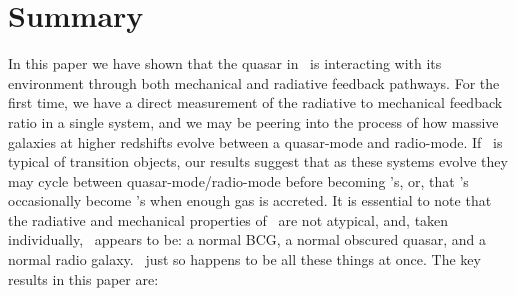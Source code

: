 \documentclass[useAMS,usenatbib]{mn2e}
\begin{document}
\section{Summary}
\label{sec:summ}

In this paper we have shown that the quasar in \inine\ is interacting
with its environment through both mechanical and radiative feedback
pathways. For the first time, we have a direct measurement of the
radiative to mechanical feedback ratio in a single system, and we may
be peering into the process of how massive galaxies at higher
redshifts evolve between a quasar-mode and radio-mode. If \irs\ is
typical of transition objects, our results suggest that as these
systems evolve they may cycle between quasar-mode/radio-mode before
becoming \fri's, or, that \fri's occasionally become \frii's when
enough gas is accreted. It is essential to note that the radiative and
mechanical properties of \irs\ are not atypical, and, taken
individually, \irs\ appears to be: a normal BCG, a normal obscured
quasar, and a normal radio galaxy. \irs\ just so happens to be all
these things at once. The key results in this paper are:
\end{document}
